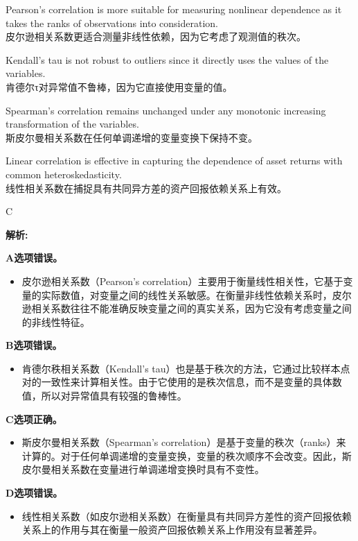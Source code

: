 \documentclass{article}
\newenvironment{explanation}
{\textbf{解析:}\par}
{\par}
\begin{document}
    \begin{choices}
        \item Pearson's correlation is more suitable for measuring nonlinear dependence as it takes the ranks of observations into consideration.\\
        皮尔逊相关系数更适合测量非线性依赖，因为它考虑了观测值的秩次。
        \item Kendall's tau is not robust to outliers since it directly uses the values of the variables.\\
        肯德尔τ对异常值不鲁棒，因为它直接使用变量的值。
        \item Spearman's correlation remains unchanged under any monotonic increasing transformation of the variables.\\
        斯皮尔曼相关系数在任何单调递增的变量变换下保持不变。
        \item Linear correlation is effective in capturing the dependence of asset returns with common heteroskedasticity.\\
        线性相关系数在捕捉具有共同异方差的资产回报依赖关系上有效。
    \end{choices}
    
    \begin{correctanswer}
        C
    \end{correctanswer}
    
    \begin{explanation}
    
    \textbf{A选项错误。}
    \begin{itemize}
        \item 皮尔逊相关系数（Pearson's correlation）主要用于衡量线性相关性，它基于变量的实际数值，对变量之间的线性关系敏感。在衡量非线性依赖关系时，皮尔逊相关系数往往不能准确反映变量之间的真实关系，因为它没有考虑变量之间的非线性特征。
    \end{itemize}
    \textbf{B选项错误。}
    \begin{itemize}
        \item 肯德尔秩相关系数（Kendall's tau）也是基于秩次的方法，它通过比较样本点对的一致性来计算相关性。由于它使用的是秩次信息，而不是变量的具体数值，所以对异常值具有较强的鲁棒性。
    \end{itemize}
    \textbf{C选项正确。}
    \begin{itemize}
        \item 斯皮尔曼相关系数（Spearman's correlation）是基于变量的秩次（ranks）来计算的。对于任何单调递增的变量变换，变量的秩次顺序不会改变。因此，斯皮尔曼相关系数在变量进行单调递增变换时具有不变性。
    \end{itemize}
    \textbf{D选项错误。}
    \begin{itemize}
        \item 线性相关系数（如皮尔逊相关系数）在衡量具有共同异方差性的资产回报依赖关系上的作用与其在衡量一般资产回报依赖关系上作用没有显著差异。
    \end{itemize}
    \end{explanation}
    
\end{document}
